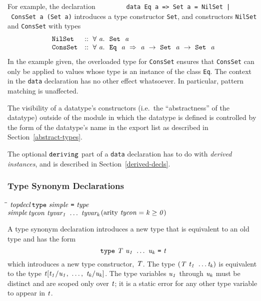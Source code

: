 For example, the declaration
\bprog
\mbox{\tt \ \ \ \ \ \ \ \ data\ Eq\ a\ =>\ Set\ a\ =\ NilSet\ |\ ConsSet\ a\ (Set\ a)}
\eprog
introduces a type constructor \mbox{\tt Set}, and constructors \mbox{\tt NilSet} and
\mbox{\tt ConsSet} with types
\[\begin{array}{ll}
\mbox{\tt NilSet}  & \mbox{$\it ::\ \forall\ a.~\ \makebox{\tt Set}~\ a$} \\
\mbox{\tt ConsSet} & \mbox{$\it ::\ \forall\ a.~\ \makebox{\tt Eq}~\ a\ \Rightarrow\ a\ \rightarrow\ \makebox{\tt Set}~\ a\ \rightarrow\ \makebox{\tt Set}~\ a$}
\end{array}\]
In the example given, the overloaded
type for \mbox{\tt ConsSet} ensures that \mbox{\tt ConsSet} can only be applied to values whose
type is an instance of the class \mbox{\tt Eq}.  The context in the \mbox{\tt data}
declaration has no other effect whatsoever.  In particular, pattern
matching is unaffected.

The visibility of a datatype's constructors (i.e.~the ``abstractness''
of the datatype) outside of the module in which the datatype is
defined is controlled by the form of the datatype's name in the export
list as described in Section~\ref{abstract-types}.

The optional \mbox{$\it \makebox{\tt deriving}$} part of a \mbox{\tt data} declaration has to do
with {\em derived instances}, and is described in
Section~\ref{derived-decls}.

\subsubsection{Type Synonym Declarations}
\label{type-synonym-decls}

\begin{flushleft}\it\begin{tabbing}
\hspace{0.5in}\=\hspace{3.0in}\=\kill
$\it topdecl$\>\makebox[3.5em]{$\rightarrow$}$\it \makebox{\tt type}\ simple\ \makebox{\tt =}\ type$\\ 
$\it simple$\>\makebox[3.5em]{$\rightarrow$}$\it tycon\ tyvar_1\ \ldots \ tyvar_k$\>\makebox[3em]{}$\it (\mbox{{\rm arity}}\ tycon=k\geq 0)$
\end{tabbing}\end{flushleft}
%
%
A type synonym declaration introduces a new type that
is equivalent to an old type and has the form
\[
\mbox{$\it \makebox{\tt type}\ T\ u_1\ \ldots \ u_k\ \makebox{\tt =}\ t$}
\]
which introduces a new type constructor, \mbox{$\it T$}.  The type \mbox{$\it (T\ t_1\ \ldots \\
\it t_k)$} is equivalent to the type \mbox{$\it t[t_1/u_1,\ \ldots ,\ t_k/u_k]$}.  The type
variables \mbox{$\it u_1$} through \mbox{$\it u_k$} must be distinct and are scoped only
over \mbox{$\it t$}; it is a static error for any other type variable to appear
in \mbox{$\it t$}.

